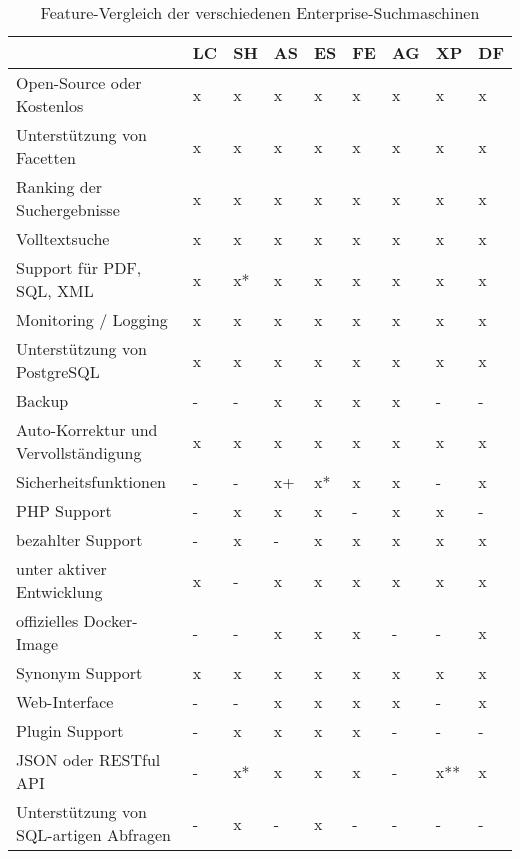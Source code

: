 \begin{table}[hbtp]
	\centering
		\begin{tabular}{l | l | l | l | l | l | l | l | l}
		& \textbf{LC} & \textbf{SH} & \textbf{AS} & \textbf{ES}  & \textbf{FE} & \textbf{AG} & \textbf{XP} & \textbf{DF} \\
        \hline
        Open-Source oder Kostenlos                  & x & x  & x & x  & x & x  & x & x \\
        Unterstützung von Facetten                  & x & x  & x & x  & x & x  & x & x \\
        Ranking der Suchergebnisse                  & x & x  & x & x  & x & x  & x & x \\
        Volltextsuche                               & x & x  & x & x  & x & x  & x & x \\
        Support für PDF, SQL, XML                   & x & x* & x & x  & x & x  & x & x \\
        Monitoring / Logging                        & x & x  & x & x  & x & x  & x & x \\
        \hline
        Unterstützung von PostgreSQL                 & x & x  & x  & x  & x & x  & x & x \\
        Backup                                      & - & -  & x  & x  & x & x & - & - \\
        Auto-Korrektur und Vervollständigung        & x & x  & x  & x  & x & x  & x & x \\
        Sicherheitsfunktionen                       & - & -  & x+ & x* & x & x  & - & x \\
        PHP Support                                 & - & x  & x  & x  & - & x  & x & - \\
        bezahlter Support                           & - & x  & -  & x  & x & x  & x & x \\
        \hline
        unter aktiver Entwicklung                   & x & -  & x  & x  & x & x  & x & x \\
        offizielles Docker-Image                    & - & -  & x  & x  & x & -  & - & x \\
        Synonym Support                             & x & x  & x  & x  & x & x  & x & x \\
        Web-Interface                               & - & -  & x  & x  & x & x  & - & x \\
        Plugin Support                              & - & x  & x  & x  & x & -  & - & - \\
        JSON oder RESTful API                       & - & x* & x  & x  & x & -  & x** & x \\
        Unterstützung von SQL-artigen Abfragen      & - & x  & -  & x  & - & -  & - & - \\
		\end{tabular}
    \caption{Feature-Vergleich der verschiedenen Enterprise-Suchmaschinen }
    \label{vglTable}


\end{table}
